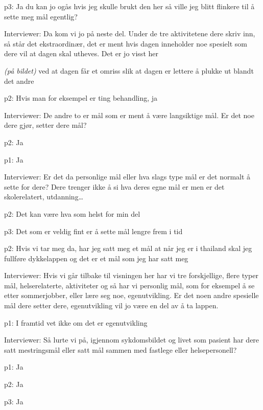 \documentclass[11pt, norsk, a4paper]{article}
\begin{document}
\textcolor{myR} {p3: }Ja du kan jo ogås hvis jeg skulle brukt den her så ville jeg blitt flinkere til å sette meg mål egentlig?


\textcolor{myBlue} {Interviewer: }Da kom vi jo på neste del. Under de tre aktivitetene dere skriv inn, så står det ekstraordinær, det er ment hvis dagen inneholder noe spesielt som dere vil at dagen skal utheves. Det er jo visst her 

\textcolor{myGrey}{\textit{(på bildet)}} ved at dagen får et omriss slik at dagen er lettere å plukke ut blandt det andre


\textcolor{myYellow} {p2: }Hvis man for eksempel er ting behandling, ja


\textcolor{myBlue} {Interviewer: }De andre to er mål som er ment å være langsiktige mål. Er det noe dere gjør, setter dere mål?


\textcolor{myYellow} {p2: }Ja


\textcolor{myGreen} {p1: }Ja


\textcolor{myBlue} {Interviewer: }Er det da personlige mål eller hva slags type mål er det normalt å sette for dere? Dere trenger ikke å si hva deres egne mål er men er det skolerelatert, utdanning\dots


\textcolor{myYellow} {p2: }Det kan være hva som helst for min del


\textcolor{myR} {p3: }Det som er veldig fint er å sette mål lengre frem i tid


\textcolor{myYellow} {p2: }Hvis vi tar meg da, har jeg satt meg et mål at når jeg er i thailand skal jeg fullføre dykkelappen og det er et mål som jeg har satt meg


\textcolor{myBlue} {Interviewer: }Hvis vi går tilbake til visningen her har vi tre forskjellige, flere typer mål, helserelaterte, aktiviteter og så har vi personlig mål, som for eksempel å se etter sommerjobber, eller lære seg noe, egenutvikling. Er det noen andre spesielle mål dere setter dere, egenutvikling vil jo være en del av å ta lappen. 


\textcolor{myGreen} {p1: }I framtid vet ikke om det er egenutvikling


\textcolor{myBlue} {Interviewer: }Så lurte vi på, igjennom sykdomsbildet og livet som pasient har dere satt mestringsmål eller satt mål sammen med fastlege eller helsepersonell?


\textcolor{myGreen} {p1: }Ja


\textcolor{myYellow} {p2: }Ja


\textcolor{myR} {p3: }Ja
\end{document}
